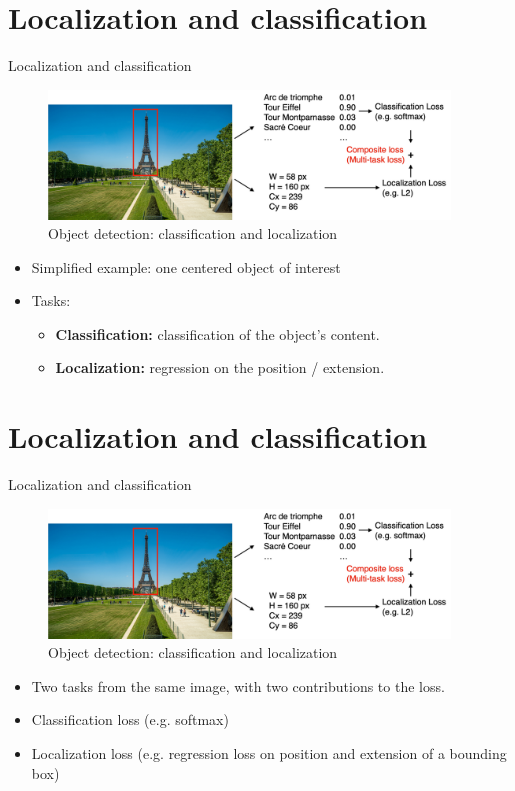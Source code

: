 \documentclass[xcolor=pdftex,dvipsnames,table]{beamer}
\begin{document}
\section{Localization and classification}
\begin{frame}{Localization and classification}
\begin{figure}[htb]
   \centering
   \includegraphics[width=0.95\textwidth]{../graphics/class_and_loc.pdf}
   \caption{Object detection: classification and localization}
\end{figure}
\begin{itemize}
\item Simplified example: one centered object of interest
\item Tasks: 
\begin{itemize}
   \item \textbf{Classification: } classification of the object's content.
   \item \textbf{Localization: } regression on the position / extension.
\end{itemize}
\end{itemize}
\end{frame}

\section{Localization and classification}
\begin{frame}{Localization and classification}
\begin{figure}[htb]
   \centering
   \includegraphics[width=0.95\textwidth]{../graphics/class_and_loc.pdf}
   \caption{Object detection: classification and localization}
\end{figure}
\begin{itemize}
   \item Two tasks from the same image, with two contributions to the loss.
   \item Classification loss (e.g. softmax)
   \item Localization loss (e.g. regression loss on position and extension of a bounding box)
\end{itemize}
\end{frame}
\end{document}
